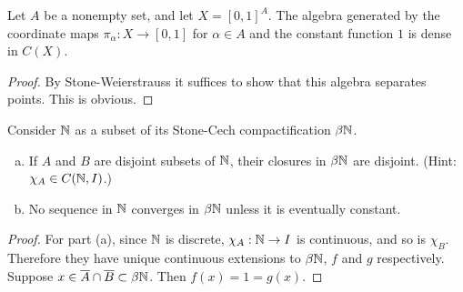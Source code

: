\documentclass{article}
\begin{document}
 Let $A$ be a nonempty set, and let $X = [0,1]^A$. The algebra generated by the coordinate maps $\pi_\alpha: X \to [0,1]$ for $\alpha \in A$ and the constant function $1$ is dense in $C(X)$.
\begin{proof}
By Stone-Weierstrauss it suffices to show that this algebra separates points. This is obvious.
\end{proof}

 Consider $\mathbb{N}$ as a subset of its Stone-Cech compactification $\beta\mathbb{N}$.
\begin{enumerate}[a.]
\item If $A$ and $B$ are disjoint subsets of $\mathbb{N}$, their closures in $\beta\mathbb{N}$ are disjoint. (Hint: $\chi_A \in C(\mathbb{N}, I)$.)
\item No sequence in $\mathbb{N}$ converges in $\beta\mathbb{N}$ unless it is eventually constant.
\end{enumerate}
\begin{proof}
For part (a), since $\mathbb{N}$ is discrete, $\chi_A: \mathbb{N} \to I$ is continuous, and so is $\chi_B$.  Therefore they have unique continuous extensions to $\beta\mathbb{N}$, $f$ and $g$ respectively. Suppose $x \in \overline{A} \cap \overline{B} \subset \beta\mathbb{N}$. Then $f(x) = 1 = g(x)$.

\end{proof}
\end{document}
